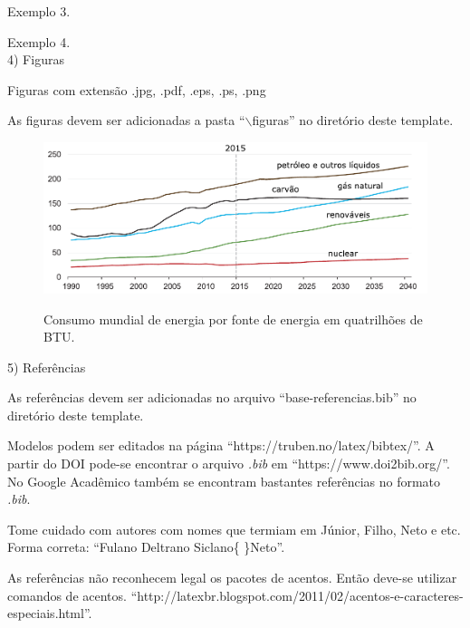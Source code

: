 Exemplo 3.

Exemplo 4.\\

4) Figuras

Figuras com extensão .jpg, .pdf, .eps, .ps, .png

As figuras devem ser adicionadas a pasta ``$\backslash$figuras'' no diretório deste template.


\begin{figure}[H]
	\centering
	\caption{Consumo mundial de energia por fonte de energia em quatrilhões de BTU.}
	\includegraphics[width=1.0\textwidth]{figuras/consumodeenergiamundialporfonte.pdf}
	\label{fig:consumomundialporfonte-fig1}
\end{figure}

5) Referências

As referências devem ser adicionadas no arquivo ``base-referencias.bib'' no diretório deste template. 

Modelos podem ser editados na página ``https://truben.no/latex/bibtex/''. A partir do DOI pode-se encontrar o arquivo \textit{.bib} em ``https://www.doi2bib.org/''. No Google Acadêmico também se encontram bastantes referências no formato \textit{.bib}.

Tome cuidado com autores com nomes que termiam em Júnior, Filho, Neto e etc. Forma correta: ``Fulano Deltrano Siclano\{ \}Neto''.

As referências não reconhecem legal os pacotes de acentos. Então deve-se utilizar comandos de acentos. ``http://latexbr.blogspot.com/2011/02/acentos-e-caracteres-especiais.html''.

